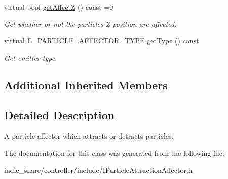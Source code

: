 \begin{DoxyCompactItemize}
\mbox{\label{classirr_1_1scene_1_1IParticleAttractionAffector_a71c62c5cd7e871eef76fca9a686e15fc}} 
virtual bool \hyperlink{classirr_1_1scene_1_1IParticleAttractionAffector_a71c62c5cd7e871eef76fca9a686e15fc}{get\+AffectZ} () const =0
\begin{DoxyCompactList}\small\item\em Get whether or not the particles Z position are affected. \end{DoxyCompactList}\item 
\mbox{\label{classirr_1_1scene_1_1IParticleAttractionAffector_a3040cb5bc4ec7eef2472be5d7d787e46}} 
virtual \hyperlink{namespaceirr_1_1scene_a34c0f9475cfcbda8b50ad816a046010b}{E\+\_\+\+P\+A\+R\+T\+I\+C\+L\+E\+\_\+\+A\+F\+F\+E\+C\+T\+O\+R\+\_\+\+T\+Y\+PE} \hyperlink{classirr_1_1scene_1_1IParticleAttractionAffector_a3040cb5bc4ec7eef2472be5d7d787e46}{get\+Type} () const
\begin{DoxyCompactList}\small\item\em Get emitter type. \end{DoxyCompactList}\end{DoxyCompactItemize}
\subsection*{Additional Inherited Members}


\subsection{Detailed Description}
A particle affector which attracts or detracts particles. 

The documentation for this class was generated from the following file\+:\begin{DoxyCompactItemize}
\item 
indie\+\_\+share/controller/include/I\+Particle\+Attraction\+Affector.\+h\end{DoxyCompactItemize}
